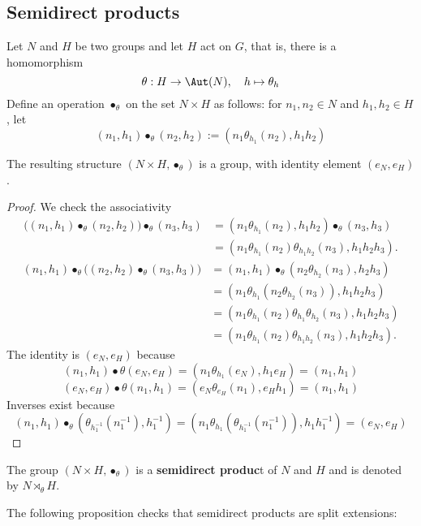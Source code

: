 \subsection{Semidirect products}
Let $N$ and $H$ be two groups and let $H$ act on $G$, that is, there is a homomorphism
\[\theta:H\to\Aut(N),\quad h\mapsto\theta_h\]
Define an operation $\bullet_\theta$ on the set $N\times H$ as follows: for $n_1,n_2\in N$ and $h_1,h_2\in H$, let
\[(n_1,h_1)\bullet_\theta(n_2,h_2):=(n_1\theta_{h_1}(n_2),h_1h_2)\]
\begin{lemma}
The resulting structure $(N\times H,\bullet_\theta)$ is a group, with identity element $(e_N,e_H)$.
\end{lemma}
\begin{proof}
We check the associativity
\begin{align*}
\big((n_1,h_1)\bullet_\theta(n_2,h_2)\big)\bullet_\theta(n_3,h_3)&=(n_1\theta_{h_1}(n_2),h_1h_2)\bullet_\theta(n_3,h_3)\\
&=(n_1\theta_{h_1}(n_2)\theta_{h_1h_2}(n_3),h_1h_2h_3).
\end{align*}
\begin{align*}
(n_1,h_1)\bullet_\theta\big((n_2,h_2)\bullet_\theta(n_3,h_3)\big)&=(n_1,h_1)\bullet_\theta(n_2\theta_{h_2}(n_3),h_2h_3)\\
&=(n_1\theta_{h_1}(n_2\theta_{h_2}(n_3)),h_1h_2h_3)\\
&=(n_1\theta_{h_1}(n_2)\theta_{h_1}\theta_{h_2}(n_3),h_1h_2h_3)\\
&=(n_1\theta_{h_1}(n_2)\theta_{h_1h_2}(n_3),h_1h_2h_3).
\end{align*}
The identity is $(e_N,e_H)$ because
\[(n_1,h_1)\bullet\theta(e_N,e_H)=(n_1\theta_{h_1}(e_N),h_1e_H)=(n_1,h_1)\]
\[(e_N,e_H)\bullet\theta(n_1,h_1)=(e_N\theta_{e_H}(n_1),e_Hh_1)=(n_1,h_1)\]
Inverses exist because
\[(n_1,h_1)\bullet_\theta(\theta_{h_1^{-1}}(n_1^{-1}),h_1^{-1})=(n_1\theta_{h_1}(\theta_{h_1^{-1}}(n_1^{-1})),h_1h_1^{-1})=(e_N,e_H)\]
\end{proof}
\begin{definition}
The group $(N\times H,\bullet_\theta)$ is a \textbf{semidirect produc}t of $N$ and $H$ and is denoted by $N\rtimes_\theta H$.
\end{definition}
The following proposition checks that semidirect products are split extensions:
